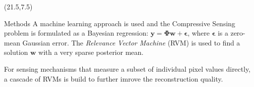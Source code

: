 \documentclass[final]{beamer}
\begin{document}
\begin{frame}{}

\begin{textblock}{19.5}(21.5,7.5)

\begin{block}{Methods}
A machine learning approach is used and the Compressive Sensing problem is formulated as a Bayesian regression: $\bm y = \bm\Phi\bm w + \bm\epsilon$, where $\bm\epsilon$ is a zero-mean Gaussian error.
The \emph{Relevance Vector Machine} (RVM) \cite{tipping2001,tipping2003} is used to find a solution $\bm w$ with a 
very sparse posterior mean.

For sensing mechanisms that measure a subset of individual pixel values directly, a cascade of RVMs \cite{pilikos2014} is build to further imrove the reconstruction quality.
\end{block}



\end{textblock}
\end{frame}
\end{document}
